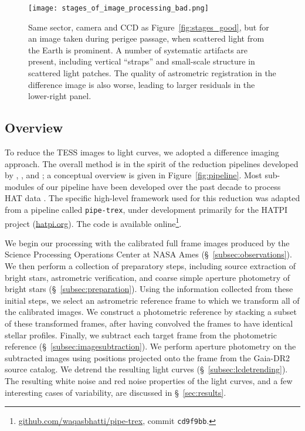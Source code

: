 \documentclass[12pt,twocolumn,tighten]{aastex62}
\begin{document}
\begin{figure}[!t]
    \begin{center}
        \leavevmode
        \texttt{[image: stages\_of\_image\_processing\_bad.png]}
    \end{center}
    \vspace{-0.6cm}
    \caption{
        Same sector, camera and CCD as Figure~\ref{fig:stages_good}, but for an image taken during
        perigee passage, when scattered light from the Earth is
        prominent.
        A number of systematic artifacts are present,
        including vertical ``straps'' and small-scale structure in scattered light
        patches.
        The quality of astrometric registration in the difference image is also
        worse, leading to larger residuals in the lower-right panel.
        \label{fig:stages_bad}
    }
\end{figure}

\subsection{Overview}

To reduce the TESS images to light curves, we adopted a
difference imaging approach.  The overall method is in the spirit of the
reduction pipelines developed by \citet{Pal_2009},
\citet{huang_high-precision_2015}, \citet{soares-furtado_image_2017}
and \citet{oelkers_precision_2018}; a conceptual overview is given in
Figure~\ref{fig:pipeline}.  Most sub-modules of our pipeline have been
developed over the past decade to process HAT data \citep[{\it
e.g.},][]{bakos_hat_review_2018}.  The specific high-level framework
used for this reduction was adapted from a pipeline called
\texttt{pipe-trex}, under development primarily for the HATPI project
(\url{hatpi.org}).  The code is available
online\footnote{\url{github.com/waqasbhatti/pipe-trex}, commit
\texttt{cd9f9bb}.}.

We begin our processing with the calibrated full frame images produced
by the Science Processing Operations Center at NASA Ames
(\S~\ref{subsec:observations}).  We then perform a collection of
preparatory steps, including source extraction of bright stars,
astrometric verification, and coarse simple aperture photometry of
bright stars (\S~\ref{subsec:preparation}).  Using the information
collected from these initial steps, we select an astrometric reference
frame to which we transform all of the calibrated images.  We
construct a photometric reference by stacking a subset of these
transformed frames, after having convolved the frames to have
identical stellar profiles. Finally, we subtract each target frame
from the photometric reference (\S~\ref{subsec:imagesubtraction}).  We
perform aperture photometry on the subtracted images using positions
projected onto the frame from the Gaia-DR2 source catalog.  We detrend
the resulting light curves (\S~\ref{subsec:lcdetrending}).  The
resulting white noise and red noise properties of the light curves,
and a few interesting cases of variability, are discussed in
\S~\ref{sec:results}.
\end{document}
